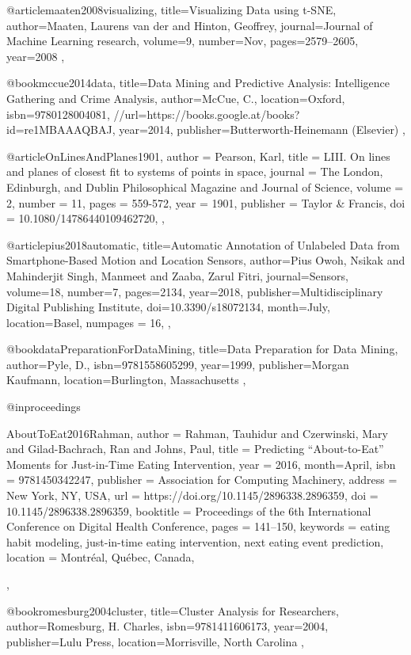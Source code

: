 @article{maaten2008visualizing,
  title={Visualizing Data using t-SNE},
  author={Maaten, Laurens van der and Hinton, Geoffrey},
  journal={Journal of Machine Learning research},
  volume={9},
  number={Nov},
  pages={2579--2605},
  year={2008}
},


@book{mccue2014data,
  title={Data Mining and Predictive Analysis: Intelligence Gathering and Crime Analysis},
  author={McCue, C.},
  location={Oxford},
  isbn={9780128004081},
  //url={https://books.google.at/books?id=re1MBAAAQBAJ},
  year={2014},
  publisher={Butterworth-Heinemann (Elsevier)}
},

@article{OnLinesAndPlanes1901,
  author = {Pearson, Karl},
  title = {LIII. On lines and planes of closest fit to systems of points in space},
  journal = {The London, Edinburgh, and Dublin Philosophical Magazine and Journal of Science},
  volume = {2},
  number = {11},
  pages = {559-572},
  year  = {1901},
  publisher = {Taylor & Francis},
  doi = {10.1080/14786440109462720},
},

@article{pius2018automatic,
  title={Automatic Annotation of Unlabeled Data from Smartphone-Based Motion and Location Sensors},
  author={Pius Owoh, Nsikak and Mahinderjit Singh, Manmeet and Zaaba, Zarul Fitri},
  journal={Sensors},
  volume={18},
  number={7},
  pages={2134},
  year={2018},
  publisher={Multidisciplinary Digital Publishing Institute},
  doi={10.3390/s18072134},
  month={July},
  location={Basel},
  numpages = {16},
},

@book{dataPreparationForDataMining,
  title={Data Preparation for Data Mining},
  author={Pyle, D.},
  isbn={9781558605299},
  year={1999},
  publisher={Morgan Kaufmann},
  location={Burlington, Massachusetts}
},


@inproceedings{AboutToEat2016Rahman,
author = {Rahman, Tauhidur and Czerwinski, Mary and Gilad-Bachrach, Ran and Johns, Paul},
title = {Predicting “About-to-Eat” Moments for Just-in-Time Eating Intervention},
year = {2016},
month={April},
isbn = {9781450342247},
publisher = {Association for Computing Machinery},
address = {New York, NY, USA},
url = {https://doi.org/10.1145/2896338.2896359},
doi = {10.1145/2896338.2896359},
booktitle = {Proceedings of the 6th International Conference on Digital Health Conference},
pages = {141–150},
keywords = {eating habit modeling, just-in-time eating intervention, next eating event prediction},
location = {Montr\'{e}al, Qu\'{e}bec, Canada},

},

@book{romesburg2004cluster,
  title={Cluster Analysis for Researchers},
  author={Romesburg, H. Charles},
  isbn={9781411606173},
  year={2004},
  publisher={Lulu Press},
  location={Morrisville, North Carolina}
},
  
